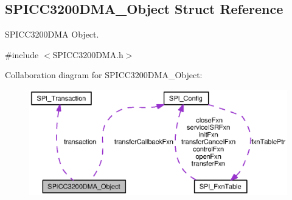 \subsection{S\-P\-I\-C\-C3200\-D\-M\-A\-\_\-\-Object Struct Reference}
\label{struct_s_p_i_c_c3200_d_m_a___object}


S\-P\-I\-C\-C3200\-D\-M\-A Object.  




{\ttfamily \#include $<$S\-P\-I\-C\-C3200\-D\-M\-A.\-h$>$}



Collaboration diagram for S\-P\-I\-C\-C3200\-D\-M\-A\-\_\-\-Object\-:
\nopagebreak
\begin{figure}[H]
\begin{center}
\leavevmode
\includegraphics[width=350pt]{struct_s_p_i_c_c3200_d_m_a___object__coll__graph}
\end{center}
\end{figure}
